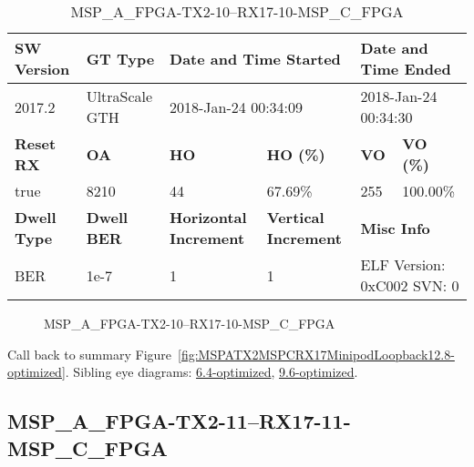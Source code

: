 \begin{table}[h]
\centering
\caption{MSP\_A\_FPGA-TX2-10--RX17-10-MSP\_C\_FPGA}
\label{tab:MSPAFPGATX210RX1710MSPCFPGA12.8-optimized}
\begin{tabular}{@{}|l|l|l|l|l|l|@{}}
\toprule
\textbf{SW Version}                & \textbf{GT Type}   & \multicolumn{2}{l|}{\textbf{Date and Time Started}}            & \multicolumn{2}{l|}{\textbf{Date and Time Ended}}        \\ \midrule
2017.2                       & UltraScale GTH          & \multicolumn{2}{l|}{2018-Jan-24 00:34:09}                   & \multicolumn{2}{l|}{2018-Jan-24 00:34:30}               \\ \midrule
\textbf{Reset RX}                  & \textbf{OA} & \textbf{HO}   & \textbf{HO (\%)} & \textbf{VO} & \textbf{VO (\%)} \\ \midrule
true & 8210        & 44          & 67.69\%        & 255        & 100.00\%       \\ \midrule
\textbf{Dwell Type}                & \textbf{Dwell BER} & \textbf{Horizontal Increment} & \textbf{Vertical Increment}    & \multicolumn{2}{l|}{\textbf{Misc Info}}                  \\ \midrule
BER                            & 1e-7        & 1        & 1           & \multicolumn{2}{l|}{ELF Version: 0xC002 SVN: 0}                         \\ \bottomrule
\end{tabular}
\end{table}

\begin{figure}[h]
\caption{MSP\_A\_FPGA-TX2-10--RX17-10-MSP\_C\_FPGA} \label{fig:MSPAFPGATX210RX1710MSPCFPGA12.8-optimized}
\end{figure}

Call back to summary Figure~\ref{fig:MSPATX2MSPCRX17MinipodLoopback12.8-optimized}.
Sibling eye diagrams: \hyperref[sec:MSPAFPGATX210RX1710MSPCFPGA6.4-optimized]{6.4-optimized}, \hyperref[sec:MSPAFPGATX210RX1710MSPCFPGA9.6-optimized]{9.6-optimized}.

\clearpage
\newpage


\subsection{MSP\_A\_FPGA-TX2-11--RX17-11-MSP\_C\_FPGA}\label{sec:MSPAFPGATX211RX1711MSPCFPGA12.8-optimized}

